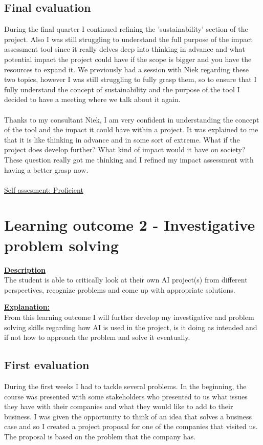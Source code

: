 \documentclass{article}
\begin{document}
	\subsection{Final evaluation} %
	During the final quarter I continued refining the 'sustainability' section of the project. Also I was still struggling to understand the full purpose of the impact assessment tool since it really delves deep into thinking in advance and what potential impact the project could have if the scope is bigger and you have the resources to expand it. We previously had a session with Niek regarding these two topics, however I was still struggling to fully grasp them, so to ensure that I fully understand the concept of sustainability and the purpose of the tool I decided to have a meeting where we talk about it again.\\\\
	Thanks to my consultant Niek, I am very confident in understanding the concept of the tool and the impact it could have within a project. It was explained to me that it is like thinking in advance and in some sort of extreme. What if the project does develop further? What kind of impact would it have on society? These question really got me thinking and I refined my impact assessment with having a better grasp now.\\\\
	\underline{Self assesment: Proficient}
	
	\section{Learning outcome 2 - Investigative problem solving}
	\underline{\textbf{Description}}\\
	The student is able to critically look at their own AI project(s) from different perspectives, 
	recognize problems and come up with appropriate solutions.
	
	\underline{\textbf{Explanation:}}\\
	From this learning outcome I will further develop my investigative and problem solving skills regarding 
	how AI is used in the project, is it doing as intended and if not how to approach the problem and solve it 
	eventually.
	
	\subsection{First evaluation}
	During the first weeks I had to tackle several problems. In the beginning, the course was presented with some stakeholders 
	who presented to us what issues they have with their companies and what they would like to add to their business. I was given 
	the opportunity to think of an idea that solves a business case and so I created a project proposal for one of the companies that visited us. 
	The proposal is based on the problem that the company has.
	
\end{document}
